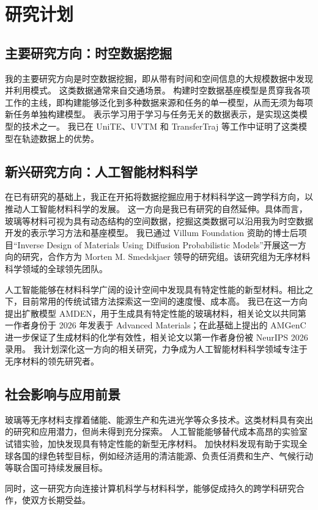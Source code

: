 \label{sec:research-plan}
\section*{研究计划}
\subsection*{主要研究方向：时空数据挖掘}
我的主要研究方向是时空数据挖掘，即从带有时间和空间信息的大规模数据中发现并利用模式。
这类数据通常来自交通场景。
构建时空数据基座模型是贯穿我各项工作的主线，即构建能够泛化到多种数据来源和任务的单一模型，从而无须为每项新任务单独构建模型。
表示学习用于学习与任务无关的数据表示，是实现这类模型的技术之一。
我已在 UniTE、UVTM 和 TransferTraj 等工作中证明了这类模型在轨迹数据上的优势。

\subsection*{新兴研究方向：人工智能材料科学}
在已有研究的基础上，我正在开拓将数据挖掘应用于材料科学这一跨学科方向，以推动人工智能材料科学的发展。
这一方向是我已有研究的自然延伸。具体而言，玻璃等材料可视为具有动态结构的空间数据，挖掘这类数据可以沿用我为时空数据开发的表示学习方法和基座模型。
我已通过 Villum Foundation 资助的博士后项目“Inverse Design of Materials Using Diffusion Probabilistic Models”开展这一方向的研究，合作方为 Morten M. Smedskjaer 领导的研究组。该研究组为无序材料科学领域的全球领先团队。

\vspace{\entryskip}
人工智能能够在材料科学广阔的设计空间中发现具有特定性能的新型材料。相比之下，目前常用的传统试错方法探索这一空间的速度慢、成本高。
我已在这一方向提出扩散模型 AMDEN，用于生成具有特定性能的玻璃材料，相关论文以共同第一作者身份于 2026 年发表于 Advanced Materials；在此基础上提出的 AMGenC 进一步保证了生成材料的化学有效性，相关论文以第一作者身份被 NeurIPS 2026 录用。
我计划深化这一方向的相关研究，力争成为人工智能材料科学领域专注于无序材料的领先研究者。

\subsection*{社会影响与应用前景}
玻璃等无序材料支撑着储能、能源生产和先进光学等众多技术。这类材料具有突出的研究和应用潜力，但尚未得到充分探索。
人工智能能够替代成本高昂的实验室试错实验，加快发现具有特定性能的新型无序材料。
加快材料发现有助于实现全球各国的绿色转型目标，例如经济适用的清洁能源、负责任消费和生产、气候行动等联合国可持续发展目标。

\vspace{\entryskip}
同时，这一研究方向连接计算机科学与材料科学，能够促成持久的跨学科研究合作，使双方长期受益。
